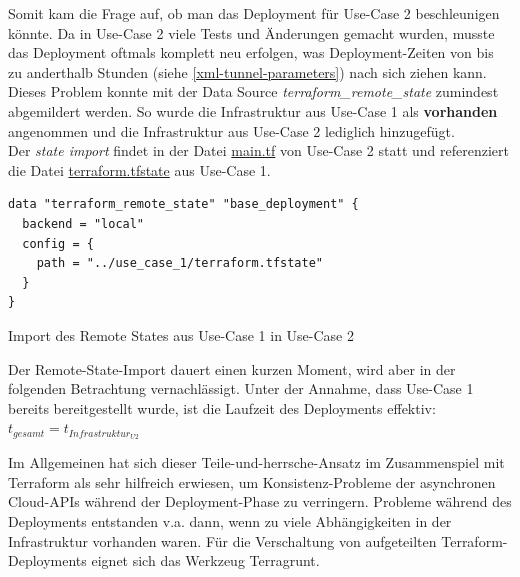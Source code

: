 Somit kam die Frage auf, ob man das \gls{Deployment} für Use-Case 2 beschleunigen könnte. Da in Use-Case 2 viele Tests und Änderungen gemacht wurden, musste das \gls{Deployment} oftmals komplett neu erfolgen, was \gls{Deployment}-Zeiten von bis zu anderthalb Stunden (siehe \ref{xml-tunnel-parameters}) nach sich ziehen kann.\\
Dieses Problem konnte mit der Data Source \textit{terraform\_remote\_state} zumindest abgemildert werden\cite{remotestateimport2021}. So wurde die Infrastruktur aus Use-Case 1 als \textbf{vorhanden} angenommen und die Infrastruktur aus Use-Case 2 lediglich hinzugefügt.\\
Der \textit{state import} findet in der Datei \underline{main.tf} von Use-Case 2 statt und referenziert die Datei \underline{terraform.tfstate} aus Use-Case 1.
\begin{listing}[h]
\begin{verbatim}
data "terraform_remote_state" "base_deployment" {
  backend = "local"
  config = {
    path = "../use_case_1/terraform.tfstate"
  }
}

\end{verbatim}
\caption{Import des Remote States aus Use-Case 1 in Use-Case 2}
\label{tf-remote-state-import}
\end{listing}\FloatBarrier
Der Remote-State-Import dauert einen kurzen Moment, wird aber in der folgenden Betrachtung vernachlässigt.
Unter der Annahme, dass Use-Case 1 bereits bereitgestellt wurde, ist die Laufzeit des \gls{Deployment}s effektiv:\\
$t_{gesamt} = t_{Infrastruktur_{U2}}$

Im Allgemeinen hat sich dieser \glqq Teile-und-herrsche\grqq{}-Ansatz im Zusammenspiel mit Terraform als sehr hilfreich erwiesen, um Konsistenz-Probleme der asynchronen Cloud-APIs während der \gls{Deployment}-Phase zu verringern\cite[S.183-184]{Brikman2019}. Probleme während des \gls{Deployment}s entstanden v.a. dann, wenn \glqq zu viele\grqq{} Abhängigkeiten in der Infrastruktur vorhanden waren. Für die Verschaltung von aufgeteilten Terraform-\gls{Deployment}s eignet sich das Werkzeug Terragrunt\cite[S.98]{Brikman2019}.
\newpage
